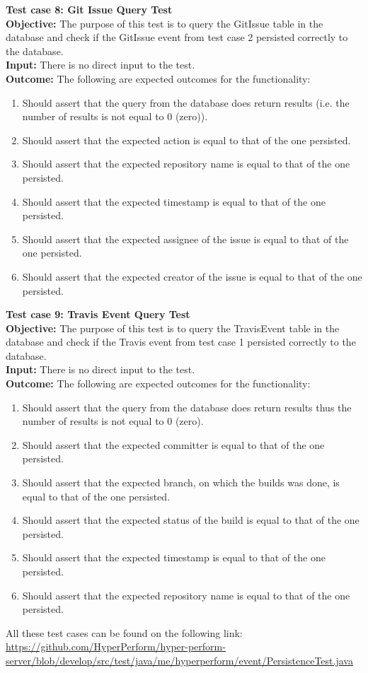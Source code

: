 \documentclass[11pt,a4paper]{article}
\begin{document}
\noindent
\textbf{Test case 8: Git Issue Query Test} \\
\textbf{Objective: } The purpose of this test is to query the GitIssue table in the database and check if the GitIssue event from test case 2 persisted correctly to the database. \\
\textbf{Input: } There is no direct input to the test. \\
\textbf{Outcome: } The following are expected outcomes for the functionality:
\begin{enumerate}
	\item Should assert that the query from the database does return results (i.e. the number of results is not equal to 0 (zero)).
	\item Should assert that the expected action is equal to that of the one persisted.
	\item Should assert that the expected repository name is equal to that of the one persisted.
	\item Should assert that the expected timestamp is equal to that of the one persisted.
	\item Should assert that the expected assignee of the issue is equal to that of the one persisted.
	\item Should assert that the expected creator of the issue is equal to that of the one persisted.\\
\end{enumerate}
\noindent
\textbf{Test case 9: Travis Event Query Test} \\
\textbf{Objective: } The purpose of this test is to query the TravisEvent table in the database and check if the Travis event from test case 1 persisted correctly to the database. \\
\textbf{Input: } There is no direct input to the test. \\
\textbf{Outcome: } The following are expected outcomes for the functionality:
\begin{enumerate}
	\item Should assert that the query from the database does return results thus the number of results is not equal to 0 (zero).
	\item Should assert that the expected committer is equal to that of the one persisted.
	\item Should assert that the expected branch, on which the builds was done, is equal to that of the one persisted.
	\item Should assert that the expected status of the build is equal to that of the one persisted.
	\item Should assert that the expected timestamp is equal to that of the one persisted.
	\item Should assert that the expected repository name is equal to that of the one persisted.\\
\end{enumerate}
All these test cases can be found on the following link:
\url{https://github.com/HyperPerform/hyper-perform-server/blob/develop/src/test/java/me/hyperperform/event/PersistenceTest.java}
\end{document}
